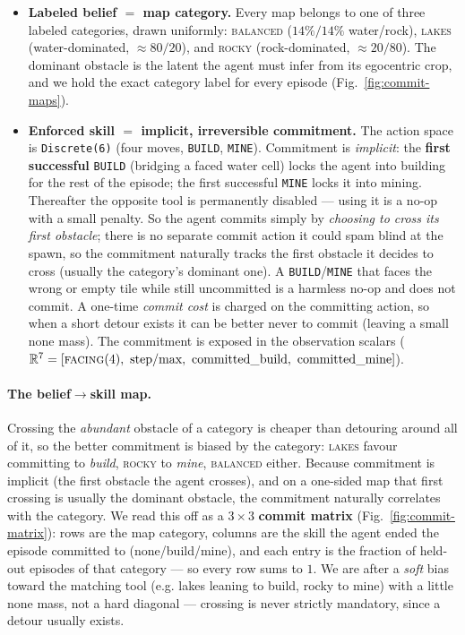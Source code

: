 \documentclass[11pt]{article}
\newcommand{\code}[1]{\texttt{#1}}
\begin{document}
\begin{itemize}[leftmargin=1.4em, itemsep=2pt]
\item \textbf{Labeled belief $=$ map category.} Every map belongs to one of three
labeled categories, drawn uniformly: \textsc{balanced} ($14\%/14\%$ water/rock),
\textsc{lakes} (water-dominated, ${\approx}80/20$), and \textsc{rocky}
(rock-dominated, ${\approx}20/80$). The dominant obstacle is the latent the agent
must infer from its egocentric crop, and we hold the exact category label for every
episode (Fig.~\ref{fig:commit-maps}).
\item \textbf{Enforced skill $=$ implicit, irreversible commitment.} The action
space is \code{Discrete(6)} (four moves, \code{BUILD}, \code{MINE}). Commitment is
\emph{implicit}: the \textbf{first successful} \code{BUILD} (bridging a faced water
cell) locks the agent into building for the rest of the episode; the first
successful \code{MINE} locks it into mining. Thereafter the opposite tool is
permanently disabled --- using it is a no-op with a small penalty. So the agent
commits simply by \emph{choosing to cross its first obstacle}; there is no separate
commit action it could spam blind at the spawn, so the commitment naturally tracks
the first obstacle it decides to cross (usually the category's dominant one). A
\code{BUILD}/\code{MINE} that faces the wrong or empty tile while still uncommitted
is a harmless no-op and does not commit. A one-time \emph{commit cost} is charged on
the committing action, so when a short detour exists it can be better never to
commit (leaving a small \textsf{none} mass). The commitment is exposed in the
observation scalars ($\mathbb{R}^{7}=[\textsc{facing}(4),\ \text{step}/\text{max},\
\text{committed\_build},\ \text{committed\_mine}]$).
\end{itemize}

\paragraph{The belief$\to$skill map.} Crossing the \emph{abundant} obstacle of a
category is cheaper than detouring around all of it, so the better commitment is
biased by the category: \textsc{lakes} favour committing to \emph{build},
\textsc{rocky} to \emph{mine}, \textsc{balanced} either. Because commitment is
implicit (the first obstacle the agent crosses), and on a one-sided map that first
crossing is usually the dominant obstacle, the commitment naturally correlates with
the category. We read this off as a $3\times3$ \textbf{commit matrix}
(Fig.~\ref{fig:commit-matrix}): rows are the map category, columns are the skill the
agent ended the episode committed to (\textsf{none}/\textsf{build}/\textsf{mine}),
and each entry is the fraction of held-out episodes of that category --- so every
row sums to $1$. We are after a \emph{soft} bias toward the matching tool (e.g.
lakes leaning to build, rocky to mine) with a little \textsf{none} mass, not a hard
diagonal --- crossing is never strictly mandatory, since a detour usually exists.
\end{document}
